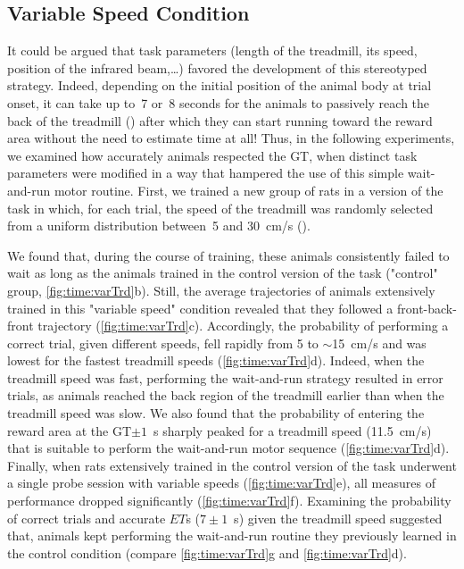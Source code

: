 \subsection{Variable Speed Condition}
\label{ch:time:varSpeed}

It could be argued that task parameters (length of the treadmill, its speed, position of the infrared beam,\dots) favored the development of this stereotyped strategy.
Indeed, depending on the initial position of the animal body at trial onset, it can take up to~7 or~8 seconds for the animals to passively reach the back of the treadmill () after which they can start running toward the reward area without the need to estimate time at all!
Thus, in the following experiments, we examined how accurately animals respected the GT, when distinct task parameters were modified in a way that hampered the use of this simple wait-and-run motor routine.
First, we trained a new group of rats in a version of the task in which, for each trial, the speed of the treadmill was randomly selected from a uniform distribution between~5 and 30~cm/s ().

We found that, during the course of training, these animals consistently failed to wait as long as the animals trained in the control version of the task ("control" group, \autoref{fig:time:varTrd}b).
Still, the average trajectories of animals extensively trained in this "variable speed" condition revealed that they followed a front-back-front trajectory (\autoref{fig:time:varTrd}c).
Accordingly, the probability of performing a correct trial, given different speeds, fell rapidly from 5 to $\sim$15~cm/s and was lowest for the fastest treadmill speeds (\autoref{fig:time:varTrd}d).
Indeed, when the treadmill speed was fast, performing the wait-and-run strategy resulted in error trials, as animals reached the back region of the treadmill earlier than when the treadmill speed was slow.
We also found that the probability of entering the reward area at the GT$\pm 1$~s sharply peaked for a treadmill speed (11.5~cm/s) that is suitable to perform the wait-and-run motor sequence (\autoref{fig:time:varTrd}d).
Finally, when rats extensively trained in the control version of the task underwent a single probe session with variable speeds (\autoref{fig:time:varTrd}e), all measures of performance dropped significantly (\autoref{fig:time:varTrd}f).
Examining the probability of correct trials and accurate $ET$s ($7\pm 1$~s) given the treadmill speed suggested that, animals kept performing the wait-and-run routine they previously learned in the control condition (compare \autoref{fig:time:varTrd}g and \autoref{fig:time:varTrd}d).
